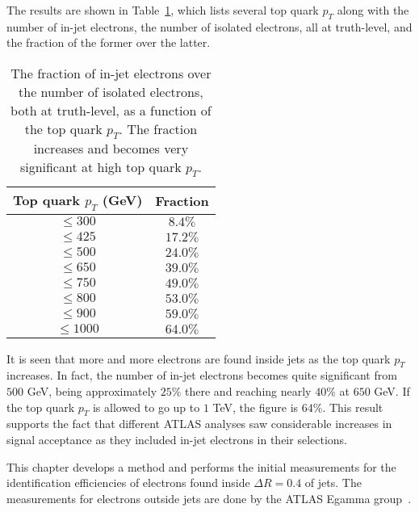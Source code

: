 The results are shown in Table~\ref{t:injetfraction}, which lists several top
quark $p_T$ along with the number of in-jet electrons, the number of isolated
electrons, all at truth-level, and the fraction of the former over the latter.

\vspace{3mm}


\renewcommand{\arraystretch}{1.15}
\begin{table}
	\centering
	\begin{tabular}{||c c||}
		\hline
		Top quark $p_T$ (GeV) & Fraction  \\ [0.5ex]
		\hline\hline
		\toprule
		$\leq 300$            & $ 8.4\%$  \\
		\hline
		$\leq 425$            & $ 17.2\%$ \\
		\hline
		$\leq 500$            & $ 24.0\%$ \\
		\hline
		$ \leq 650$           & $ 39.0\%$ \\
		\hline
		$ \leq 750$           & $ 49.0\%$ \\
		\hline
		$ \leq 800$           & $ 53.0\%$ \\
		\hline
		$ \leq 900$           & $ 59.0\%$ \\
		\hline
		$ \leq 1000$          & $ 64.0\%$ \\
		\hline
	\end{tabular}

	\caption{The fraction of in-jet electrons over the number of isolated
		electrons, both at truth-level, as a function of the top quark $p_T$. The
		fraction increases and becomes very significant at high top quark $p_T$.}

	\label{t:injetfraction}
\end{table}
\renewcommand{\arraystretch}{1.0}

It is seen that more and more electrons are found inside jets as the top quark
$p_T$ increases. In fact, the number of in-jet electrons becomes quite
significant from $500$ GeV, being approximately $25\%$ there and reaching
nearly $40\%$ at $650$ GeV. If the top quark $p_T$ is allowed to go up to $1$
TeV, the figure is $64\%$. This result supports the fact that different ATLAS
analyses saw considerable increases in signal acceptance as they included
in-jet electrons in their selections.

This chapter develops a method and performs the initial measurements for the
identification efficiencies of electrons found inside $\Delta R=0.4$ of jets.
The measurements for electrons outside jets are done by the ATLAS Egamma
group~\cite{atlaselcid, eleffme}.


